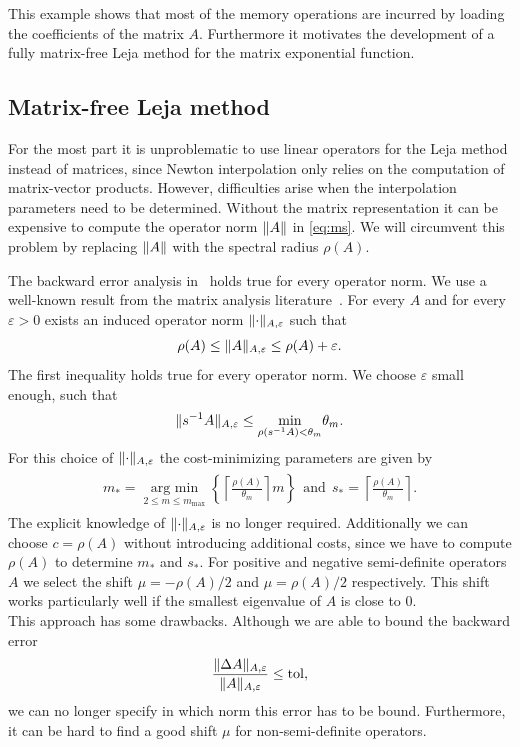 \documentclass{scrartcl}
\begin{document}
	This example shows that most of the memory operations are incurred by loading the coefficients of the matrix $A$. Furthermore it motivates the development of a fully matrix-free Leja method for the matrix exponential function. 


\subsection{Matrix-free Leja method} \label{sec:MatrixFreeLejaMethod}
	For the most part it is unproblematic to use linear operators for the Leja method instead of matrices, since Newton interpolation only relies on the computation of matrix-vector products. However, difficulties arise when the interpolation parameters need to be determined. Without the matrix representation it can be expensive to compute the operator norm $\lVert A\rVert$ in \eqref{eq:ms}. We will circumvent this problem by replacing $\lVert A\rVert$ with the spectral radius $\rho(A)$. 
	
	The backward error analysis in~\cite{lejarev} holds true for every operator norm.
	We use a well-known result from the matrix analysis literature~\cite[Lemma 5.6.10.]{matrixanalysis}. For every $A$ and for every $\varepsilon>0$ exists an induced operator norm $\lVert\cdot\rVert_{A,\varepsilon}$ such that
	\[
	\rho(A) \le \lVert A\rVert_{A,\varepsilon} \le \rho(A) + \varepsilon. 
	\]
	The first inequality holds true for every operator norm. We choose $\varepsilon$ small enough, such that
	\[
	\lVert s^{-1}A\rVert_{A,\varepsilon} \le \underset{\rho(s^{-1}A) < \theta_m}{\min}\theta_m.
	\]
	For this choice of $\lVert\cdot\rVert_{A,\varepsilon}$ the cost-minimizing parameters are given by
	\begin{align}
	\begin{split}
		m_* = \underset{2\le m\le m_{\operatorname{max}}}{\operatorname{arg\ min}}  \left\{{\left\lceil{\frac{\rho(A)}{\theta_m}}\right\rceil}m\right\} ~~\text{and}~~
		s_* =  \left\lceil{\frac{\rho(A)}{\theta_m}}\right\rceil.
	\end{split}\label{eq:msmatrixfree}
	\end{align}
	The explicit knowledge of $\lVert\cdot\rVert_{A,\varepsilon}$ is no longer required. Additionally we can choose $c=\rho(A)$ without introducing additional costs, since we have to compute $\rho(A)$ to determine $m_*$ and $s_*$. 
	For positive and negative semi-definite operators $A$ we select the shift $\mu = -\rho(A)/2$ and $\mu = \rho(A)/2$ respectively. This shift works particularly well if the smallest eigenvalue of $A$ is close to $0$.\\
	This approach has some drawbacks. Although we are able to bound the backward error
	\[
		\frac{\lVert\Delta A\rVert_{A,\varepsilon}}{\lVert A\rVert_{A,\varepsilon}} \le \operatorname{tol},  
	\]
	we can no longer specify in which norm this error has to be bound. Furthermore, it can be hard to find a good shift $\mu$ for non-semi-definite operators.
\end{document}

